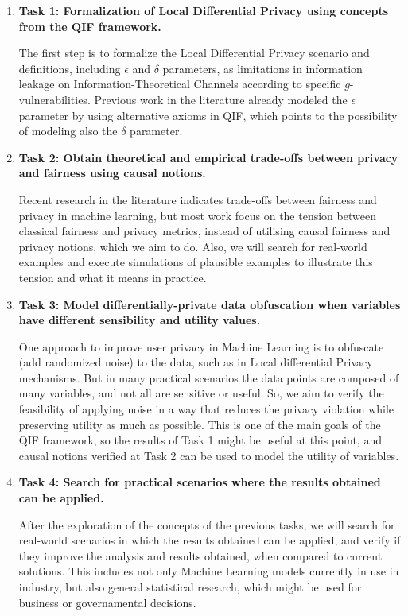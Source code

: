 \documentclass[12pt]{article}
\begin{document}
\begin{enumerate}
\item \textbf{Task 1: Formalization of Local Differential Privacy using concepts from the QIF framework.}

The first step is to formalize the Local Differential Privacy scenario and definitions, including $\epsilon$ and $\delta$ parameters, as limitations in information leakage on Information-Theoretical Channels according to specific $g$-vulnerabilities. Previous work in the literature\cite{fernandes2022explaining} already modeled the $\epsilon$ parameter by using alternative axioms in QIF, which points to the possibility of modeling also the $\delta$ parameter.

\item \textbf{Task 2: Obtain theoretical and empirical trade-offs between privacy and fairness using causal notions.}

Recent research in the literature indicates trade-offs between fairness and privacy in machine learning\cite{arcolezi2023local}\cite{makhlouf2024impact}, but most work focus on the tension between classical fairness and privacy metrics, instead of utilising causal fairness\cite{CausalFair} and privacy\cite{tschantz2020sok} notions, which we aim to do. Also, we will search for real-world examples and execute simulations of plausible examples to illustrate this tension and what it means in practice.

\item \textbf{Task 3: Model differentially-private data obfuscation when variables have different sensibility and utility values.}

One approach to improve user privacy in Machine Learning is to obfuscate (add randomized noise) to the data, such as in Local differential Privacy mechanisms. But in many practical scenarios the data points are composed of many variables, and not all are sensitive or useful. So, we aim to verify the feasibility of applying noise in a way that reduces the privacy violation while preserving utility as much as possible. This is one of the main goals of the QIF framework, so the results of Task 1 might be useful at this point, and causal notions verified at Task 2 can be used to model the utility of variables.

\item \textbf{Task 4: Search for practical scenarios where the results obtained can be applied.}

After the exploration of the concepts of the previous tasks, we will search for real-world scenarios in which the results obtained can be applied, and verify if they improve the analysis and results obtained, when compared to current solutions. This includes not only Machine Learning models currently in use in industry, but also general statistical research, which might be used for business or governamental decisions.
\end{enumerate}
\end{document}

